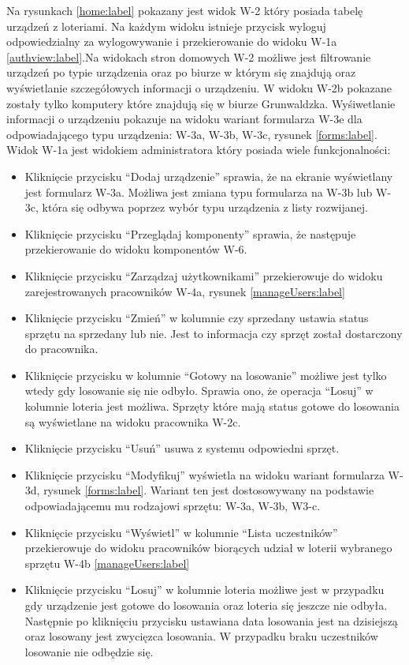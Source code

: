Na rysunkach \ref{home:label} pokazany jest widok W-2 który posiada tabelę urządzeń z loteriami. Na każdym widoku istnieje przycisk wyloguj odpowiedzialny za wylogowywanie i przekierowanie do widoku W-1a \ref{authview:label}.Na widokach stron domowych W-2 możliwe jest filtrowanie urządzeń po typie urządzenia oraz po biurze w którym się znajdują oraz wyświetlanie szczegółowych informacji o urządzeniu. W widoku W-2b pokazane zostały tylko komputery które znajdują się w biurze Grunwaldzka. Wyśiwetlanie informacji o urządzeniu pokazuje na widoku wariant formularza W-3e dla odpowiadającego typu urządzenia: W-3a, W-3b, W-3c, rysunek \ref{forms:label}. Widok W-1a jest widokiem administratora który posiada wiele funkcjonalności:
\begin{itemize}
	\item Kliknięcie przycisku "`Dodaj urządzenie"' sprawia, że na ekranie wyświetlany jest formularz W-3a. Możliwa jest zmiana typu formularza na W-3b lub W-3c, która się odbywa poprzez wybór typu urządzenia z listy rozwijanej.
	\item Kliknięcie przycisku "`Przeglądaj komponenty"' sprawia, że następuje przekierowanie do widoku komponentów W-6.
	\item Kliknięcie przycisku "`Zarządzaj użytkownikami"' przekierowuje do widoku zarejestrowanych pracowników W-4a, rysunek \ref{manageUsers:label}
	\item Kliknięcie przycisku "`Zmień"' w kolumnie czy sprzedany ustawia status sprzętu na sprzedany lub nie. Jest to informacja czy sprzęt został dostarczony do pracownika.
	\item Kliknięcie przycisku w kolumnie "`Gotowy na losowanie"' możliwe jest tylko wtedy gdy losowanie się nie odbyło. Sprawia ono, że operacja "`Losuj"' w kolumnie loteria jest możliwa. Sprzęty które mają status gotowe do losowania są wyświetlane na widoku pracownika W-2c.
	\item Kliknięcie przycisku "`Usuń"' usuwa z systemu odpowiedni sprzęt.
	\item Kliknięcie przycisku "`Modyfikuj"' wyświetla na widoku wariant formularza W-3d, rysunek \ref{forms:label}. Wariant ten jest dostosowywany na podstawie odpowiadającemu mu rodzajowi sprzętu: W-3a, W-3b, W3-c.
	\item Kliknięcie przycisku "`Wyświetl"' w kolumnie "`Lista uczestników"' przekierowuje do widoku pracowników biorących udział w loterii wybranego sprzętu W-4b \ref{manageUsers:label}
	\item Kliknięcie przycisku "`Losuj"' w kolumnie loteria możliwe jest w przypadku gdy urządzenie jest gotowe do losowania oraz loteria się jeszcze nie odbyła. Następnie po kliknięciu przycisku ustawiana data losowania jest na dzisiejszą oraz losowany jest zwycięzca losowania. W przypadku braku uczestników losowanie nie odbędzie się.
\end{itemize}
